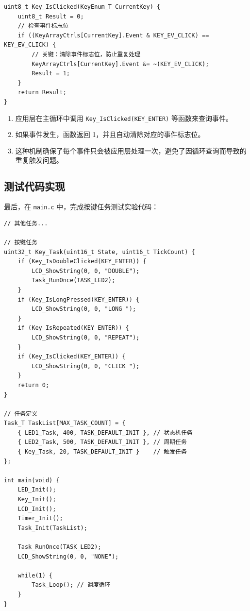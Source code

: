 \begin{lstlisting}[style=c]
uint8_t Key_IsClicked(KeyEnum_T CurrentKey) {
    uint8_t Result = 0;
    // 检查事件标志位
    if ((KeyArrayCtrls[CurrentKey].Event & KEY_EV_CLICK) == KEY_EV_CLICK) {
        // 关键：清除事件标志位，防止重复处理
        KeyArrayCtrls[CurrentKey].Event &= ~(KEY_EV_CLICK);
        Result = 1;
    }
    return Result;
}
\end{lstlisting}

\begin{enumerate}
\item 应用层在主循环中调用 \texttt{Key\_IsClicked(KEY\_ENTER)} 等函数来查询事件。
\item 如果事件发生，函数返回 1，并且自动清除对应的事件标志位。
\item 这种机制确保了每个事件只会被应用层处理一次，避免了因循环查询而导致的重复触发问题。
\end{enumerate}

\subsection{测试代码实现}

最后，在 \texttt{main.c} 中，完成按键任务测试实验代码：

\begin{lstlisting}[style=c]
// 其他任务...

// 按键任务
uint32_t Key_Task(uint16_t State, uint16_t TickCount) {
    if (Key_IsDoubleClicked(KEY_ENTER)) {
        LCD_ShowString(0, 0, "DOUBLE");
        Task_RunOnce(TASK_LED2);
    }
    if (Key_IsLongPressed(KEY_ENTER)) {
        LCD_ShowString(0, 0, "LONG ");
    }
    if (Key_IsRepeated(KEY_ENTER)) {
        LCD_ShowString(0, 0, "REPEAT");
    }
    if (Key_IsClicked(KEY_ENTER)) {
        LCD_ShowString(0, 0, "CLICK ");
    }
    return 0;
}

// 任务定义
Task_T TaskList[MAX_TASK_COUNT] = {
    { LED1_Task, 400, TASK_DEFAULT_INIT }, // 状态机任务
    { LED2_Task, 500, TASK_DEFAULT_INIT }, // 周期任务
    { Key_Task, 20, TASK_DEFAULT_INIT }    // 触发任务
};

int main(void) {
    LED_Init();
    Key_Init();
    LCD_Init();
    Timer_Init();
    Task_Init(TaskList);

    Task_RunOnce(TASK_LED2);
    LCD_ShowString(0, 0, "NONE");

    while(1) {
        Task_Loop(); // 调度循环
    }
}
\end{lstlisting}

